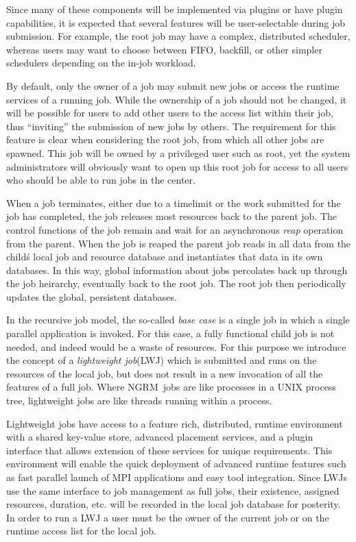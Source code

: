 \documentclass{article}
\newcommand{\ngrm}{NGRM}
\begin{document}
Since many of these components will be implemented via plugins or
have plugin capabilities, it is expected that several features will
be user-selectable during job submission. For example, the root
job may have a complex, distributed scheduler, whereas users may
want to choose between FIFO, backfill, or other simpler schedulers
depending on the in-job workload.

By default, only the owner of a job may submit new jobs or access
the runtime services of a running job.  While the ownership of a job
should not be changed, it will be possible for users to add other
users to the access list within their job, thus ``inviting'' the
submission of new jobs by others. The requirement for this feature
is clear when considering the root job, from which all other jobs
are spawned. This job will be owned by a privileged user such as
root, yet the system administrators will obviously want to open
up this root job for access to all users who should be able to
run jobs in the center.

When a job terminates, either due to a timelimit or the work
submitted for the job has completed, the job releases most resources
back to the parent job. The control functions of the job remain and
wait for an asynchronous {\em reap} operation from the parent. When
the job is reaped the parent job reads in all data from the child\'s
local job and resource database and instantiates that data in
its own databases. In this way, global information about jobs
percolates back up through the job heirarchy, eventually back to
the root job.  The root job then periodically updates the global,
persistent databases.

In the recursive job model, the so-called {\em base case} is a
single job in which a single parallel application is invoked. For
this case, a fully functional child job is not needed, and indeed
would be a waste of resources. For this purpose we introduce the
concept of a {\em lightweight job}(LWJ) which is submitted and
runs on the resources of the local job, but does not result in
a new invocation of all the features of a full job. Where
\ngrm\ jobs are like processes in a UNIX process tree, lightweight jobs
are like threads running within a process.

Lightweight jobs have access to a feature rich, distributed,
runtime environment with a shared key-value store, advanced
placement services, and a plugin interface that allows extension
of these services for unique requirements. This environment will
enable the quick deployment of advanced runtime features such as
fast parallel launch of MPI applications and easy tool integration.
Since LWJs use the same interface to job management as full
jobs, their existence, assigned resources, duration, etc.
will be recorded in the local job database for posterity.
In order to run a LWJ a user must be the owner of the current
job or on the runtime access list for the local job.
\end{document}
